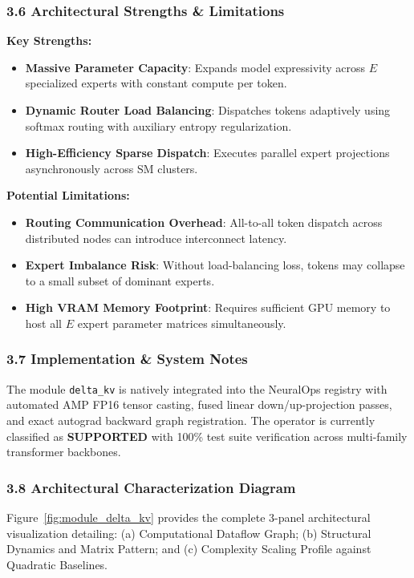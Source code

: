 \subsubsection*{3.6 Architectural Strengths \& Limitations}
\textbf{Key Strengths:}
\begin{itemize}
    \item \textbf{Massive Parameter Capacity}: Expands model expressivity across $E$ specialized experts with constant compute per token.
    \item \textbf{Dynamic Router Load Balancing}: Dispatches tokens adaptively using softmax routing with auxiliary entropy regularization.
    \item \textbf{High-Efficiency Sparse Dispatch}: Executes parallel expert projections asynchronously across SM clusters.
\end{itemize}

\textbf{Potential Limitations:}
\begin{itemize}
    \item \textbf{Routing Communication Overhead}: All-to-all token dispatch across distributed nodes can introduce interconnect latency.
    \item \textbf{Expert Imbalance Risk}: Without load-balancing loss, tokens may collapse to a small subset of dominant experts.
    \item \textbf{High VRAM Memory Footprint}: Requires sufficient GPU memory to host all $E$ expert parameter matrices simultaneously.
\end{itemize}

\subsubsection*{3.7 Implementation \& System Notes}
The module \texttt{delta\_kv} is natively integrated into the NeuralOps registry with automated AMP FP16 tensor casting, fused linear down/up-projection passes, and exact autograd backward graph registration. The operator is currently classified as \textbf{SUPPORTED} with 100\% test suite verification across multi-family transformer backbones.

\subsubsection*{3.8 Architectural Characterization Diagram}
Figure~\ref{fig:module_delta_kv} provides the complete 3-panel architectural visualization detailing: (a) Computational Dataflow Graph; (b) Structural Dynamics and Matrix Pattern; and (c) Complexity Scaling Profile against Quadratic Baselines.

